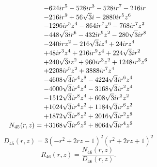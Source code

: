 \documentclass[11pt,a4paper]{article}
\begin{document}
\begin{equation}
N_{45}(r,z)=\shortstack[l]{$\displaystyle  - 624 i r^{5} - 528 i r^{3} - 528 i r^{7} - 216 i r$\\
$\displaystyle  - 216 i r^{9} + 56 \sqrt{3} i - 2880 i r^{5} z^{6}$\\
$\displaystyle  - 1296 i r^{5} z^{4} - 864 i r^{7} z^{6} - 768 i r^{7} z^{2}$\\
$\displaystyle  - 448 \sqrt{3} i r^{6} - 432 i r^{9} z^{2} - 280 \sqrt{3} i r^{8}$\\
$\displaystyle  - 240 i r z^{2} - 216 \sqrt{3} i z^{4} + 24 i r z^{4}$\\
$\displaystyle  + 48 i r^{3} z^{4} + 216 i r^{9} z^{4} + 224 \sqrt{3} i r^{2}$\\
$\displaystyle  + 240 \sqrt{3} i z^{2} + 960 i r^{3} z^{2} + 1248 i r^{3} z^{6}$\\
$\displaystyle  + 2208 i r^{5} z^{2} + 3888 i r^{7} z^{4}$\\
$\displaystyle  - 4608 \sqrt{3} i r^{4} z^{8} - 4224 \sqrt{3} i r^{6} z^{4}$\\
$\displaystyle  - 4000 \sqrt{3} i r^{4} z^{4} - 3168 \sqrt{3} i r^{2} z^{4}$\\
$\displaystyle  - 1512 \sqrt{3} i r^{8} z^{4} + 608 \sqrt{3} i r^{2} z^{2}$\\
$\displaystyle  + 1024 \sqrt{3} i r^{4} z^{2} + 1184 \sqrt{3} i r^{6} z^{2}$\\
$\displaystyle  + 1872 \sqrt{3} i r^{8} z^{2} + 2016 \sqrt{3} i r^{2} z^{6}$\\
$\displaystyle  + 3168 \sqrt{3} i r^{6} z^{6} + 8064 \sqrt{3} i r^{4} z^{6}$}
\label{eq:cat-numerator-45}
\end{equation}
\begin{equation}
D_{45}(r,z)=3 \left(- r^{2} + 2 r z - 1\right)^{2} \left(r^{2} + 2 r z + 1\right)^{2}
\label{eq:cat-denominator-45}
\end{equation}
\begin{equation}
R_{46}(r,z)=\frac{N_{46}(r,z)}{D_{46}(r,z)}.
\label{eq:cat-rational-46}
\end{equation}
\end{document}
